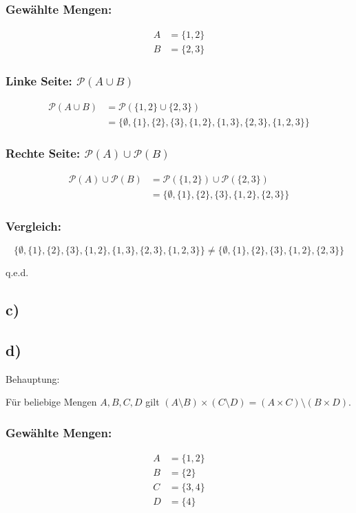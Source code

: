 \documentclass{article}
\begin{document}
\subsubsection*{Gewählte Mengen:}
\begin{align*}
A &= \{1,2\} \\
B &= \{2,3\}
\end{align*}

\subsubsection*{Linke Seite: $\mathcal{P}(A \cup B)$}
\begin{align*}
	\mathcal{P}(A \cup B) &= \mathcal{P}(\{1,2\} \cup \{2,3\}) \\
												&= \{\emptyset, \{1\}, \{2\}, \{3\}, \{1,2\}, \{1,3\}, \{2,3\}, \{1,2,3\}\}
\end{align*}

\subsubsection*{Rechte Seite: $\mathcal{P}(A) \cup \mathcal{P}(B)$}
\begin{align*}
	\mathcal{P}(A) \cup \mathcal{P}(B) &= \mathcal{P}(\{1,2\}) \cup \mathcal{P}(\{2,3\}) \\
																		 &= \{\emptyset, \{1\}, \{2\}, \{3\}, \{1,2\}, \{2,3\}\}
\end{align*}

\subsubsection*{Vergleich:}
$$\{\emptyset, \{1\}, \{2\}, \{3\}, \{1,2\}, \{1,3\}, \{2,3\}, \{1,2,3\}\}
 \neq \{\emptyset, \{1\}, \{2\}, \{3\}, \{1,2\}, \{2,3\}\}$$

q.e.d.

\subsection*{c)}

\subsection*{d)}
Behauptung: 

Für beliebige Mengen $A, B, C, D$ gilt 
$(A \setminus B) \times (C \setminus D) = (A \times C) \setminus (B \times D)$.

\subsubsection*{Gewählte Mengen:}
\begin{align*}
A &= \{1, 2\} \\
B &= \{2\} \\
C &= \{3, 4\} \\
D &= \{4\}
\end{align*}
\end{document}
